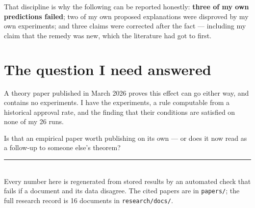 \documentclass[11pt,a4paper]{article}
\begin{document}
That discipline is why the following can be reported honestly: \textbf{three of my own
predictions failed}; two of my own proposed explanations were disproved by my own
experiments; and three claims were corrected after the fact --- including my claim that the
remedy was new, which the literature had got to first.

\section{The question I need answered}

A theory paper published in March 2026 proves this effect can go either way, and contains no
experiments. I have the experiments, a rule computable from a historical approval rate, and
the finding that their conditions are satisfied on none of my 26 runs.

Is that an empirical paper worth publishing on its own --- or does it now read as a follow-up
to someone else's theorem?

\vfill
\noindent\rule{\textwidth}{0.4pt}\\
{\small Every number here is regenerated from stored results by an automated check that
fails if a document and its data disagree. The cited papers are in \texttt{papers/}; the
full research record is 16 documents in \texttt{research/docs/}.}
\end{document}
